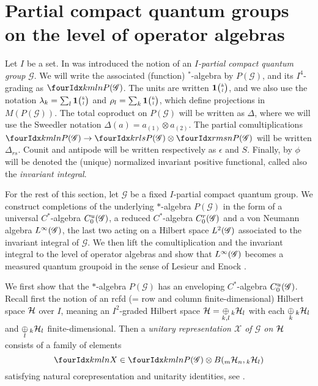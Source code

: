 \section{Partial compact quantum groups on the level of operator algebras}

Let $I$ be a set. In \cite[Definition 1.17]{DCT1} was introduced the notion of an \emph{$I$-partial compact quantum group} $\mathscr{G}$. We will write the associated (function) $^*$-algebra by $P(\mathscr{G})$, and its $I^4$-grading as $\Gr{P(\mathscr{G})}{k}{l}{m}{n}$. The units are written $\mathbf{1}{\tiny {\begin{pmatrix} k\\l\end{pmatrix}}}$, and we also use the notation $\lambda_k = \sum_l \mathbf{1}{\tiny {\begin{pmatrix} k\\l\end{pmatrix}}}$ and $\rho_l = \sum_{k}\mathbf{1}{\tiny {\begin{pmatrix} k\\l\end{pmatrix}}}$, which define projections in $M(P(\mathscr{G}))$. The total coproduct on $P(\mathscr{G})$ will be written as $\Delta$, where we will use the Sweedler notation $\Delta(a) = a_{(1)}\otimes a_{(2)}$. The partial comultiplications $\Gr{P(\mathscr{G})}{k}{l}{m}{n}\rightarrow \Gr{P(\mathscr{G})}{k}{l}{r}{s}\otimes \Gr{P(\mathscr{G})}{r}{s}{m}{n}$ will be written $\Delta_{rs}$. Counit and antipode will be written respectively as $\epsilon$ and $S$. Finally, by $\phi$ will be denoted the (unique) normalized invariant positive functional, called also the \emph{invariant integral}. 

For the rest of this section, let $\mathscr{G}$ be a fixed $I$-partial compact quantum group. We construct
completions of the underlying $*$-algebra $P(\mathscr{G})$ in the form
of a universal $C^{*}$-algebra $C^{u}_{0}(\mathscr{G})$, a reduced $C^{*}$-algebra
$C^{r}_{0}(\mathscr{G})$ and a von Neumann algebra $L^{\infty}(\mathscr{G})$, the last two acting on a
Hilbert space $L^{2}(\mathscr{G})$ associated to the invariant integral of
$\mathscr{G}$.  We then lift the comultiplication and the invariant
integral to the level of
operator algebras and show that $L^{\infty}(\mathscr{G})$ becomes a measured quantum
groupoid in the sense of Lesieur \cite{Les1} and Enock \cite{Eno2}.

We first show that the $*$-algebra $P(\mathscr{G})$ has an enveloping $C^{*}$-algebra $C^{u}_{0}(\mathscr{G})$. Recall first the notion of an rcfd (= row and column finite-dimensional) Hilbert space $\mathcal{H}$ over $I$, meaning an $I^2$-graded Hilbert space $\mathcal{H} = \underset{k,l}{\oplus} \,{}_{k}\mathcal{H}_{l}$ with each $\underset{k}{\oplus}\, {}_{k}\mathcal{H}_{l}$ and $\underset{l}{\oplus}\, {}_{k}\mathcal{H}_{l}$ finite-dimensional. Then a \emph{unitary representation $\mathscr{X}$ of $\mathscr{G}$ on $\mathcal{H}$} consists of a family of elements \[\Gr{X}{k}{l}{m}{n} \in \Gr{P(\mathscr{G})}{k}{l}{m}{n}\otimes B(\GrDA{\Hsp}{m}{n},\GrDA{\Hsp}{k}{l})\] satisfying natural corepresentation and unitarity identities, see \cite[Section 2.1 and Section 2.4]{DCT1}.


